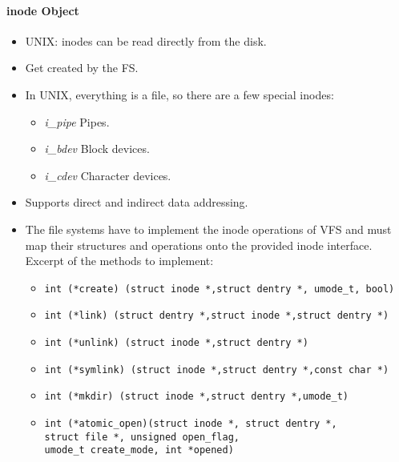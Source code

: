\documentclass[a4paper, 11pt, accentcolor = tud3b]{tudreport}
\begin{document}
	            \paragraph{inode Object}
		            \begin{itemize}
		            	\item UNIX: inodes can be read directly from the disk.
		            	\item Get created by the FS.
		            	\item In UNIX, everything is a file, so there are a few special inodes:
			            	\begin{itemize}
			            		\item \textit{i\_pipe} \tabto{1.5cm} Pipes.
			            		\item \textit{i\_bdev} \tabto{1.5cm} Block devices.
			            		\item \textit{i\_cdev} \tabto{1.5cm} Character devices.
			            	\end{itemize}
		            	\item Supports direct and indirect data addressing.
		            	\item The file systems have to implement the inode operations of VFS and must map their structures and operations onto the provided inode interface. Excerpt of the methods to implement:
			            	\begin{itemize}
\item \texttt{int (*create) (struct inode *,struct dentry *, umode_t, bool)}
\item \texttt{int (*link) (struct dentry *,struct inode *,struct dentry *)}
\item \texttt{int (*unlink) (struct inode *,struct dentry *)}
\item \texttt{int (*symlink) (struct inode *,struct dentry *,const char *)}
\item \texttt{int (*mkdir) (struct inode *,struct dentry *,umode_t)}
\item \texttt{int (*atomic_open)(struct inode *, struct dentry *,\\\null\qquad\qquad\qquad\qquad\qquad\qquad struct file *, unsigned open_flag,\\\null\qquad\qquad\qquad\qquad\qquad\qquad umode_t create_mode, int *opened)}
			            	\end{itemize}
		            \end{itemize}
        
\end{document}
